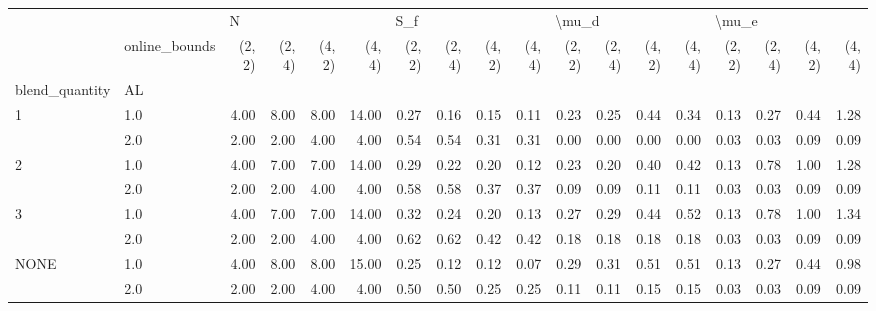 \begin{tabular}{llrrrrrrrrrrrrrrrr}
\toprule
     & {} & \multicolumn{4}{l}{N} & \multicolumn{4}{l}{S\_f} & \multicolumn{4}{l}{\textbackslash mu\_d} & \multicolumn{4}{l}{\textbackslash mu\_e} \\
     & online\_bounds & (2, 2) & (2, 4) & (4, 2) & (4, 4) & (2, 2) & (2, 4) & (4, 2) & (4, 4) & (2, 2) & (2, 4) & (4, 2) & (4, 4) & (2, 2) & (2, 4) & (4, 2) & (4, 4) \\
blend\_quantity & AL &        &        &        &        &        &        &        &        &        &        &        &        &        &        &        &        \\
\midrule
1 & 1.0 &   4.00 &   8.00 &   8.00 &  14.00 &   0.27 &   0.16 &   0.15 &   0.11 &   0.23 &   0.25 &   0.44 &   0.34 &   0.13 &   0.27 &   0.44 &   1.28 \\
     & 2.0 &   2.00 &   2.00 &   4.00 &   4.00 &   0.54 &   0.54 &   0.31 &   0.31 &   0.00 &   0.00 &   0.00 &   0.00 &   0.03 &   0.03 &   0.09 &   0.09 \\
2 & 1.0 &   4.00 &   7.00 &   7.00 &  14.00 &   0.29 &   0.22 &   0.20 &   0.12 &   0.23 &   0.20 &   0.40 &   0.42 &   0.13 &   0.78 &   1.00 &   1.28 \\
     & 2.0 &   2.00 &   2.00 &   4.00 &   4.00 &   0.58 &   0.58 &   0.37 &   0.37 &   0.09 &   0.09 &   0.11 &   0.11 &   0.03 &   0.03 &   0.09 &   0.09 \\
3 & 1.0 &   4.00 &   7.00 &   7.00 &  14.00 &   0.32 &   0.24 &   0.20 &   0.13 &   0.27 &   0.29 &   0.44 &   0.52 &   0.13 &   0.78 &   1.00 &   1.34 \\
     & 2.0 &   2.00 &   2.00 &   4.00 &   4.00 &   0.62 &   0.62 &   0.42 &   0.42 &   0.18 &   0.18 &   0.18 &   0.18 &   0.03 &   0.03 &   0.09 &   0.09 \\
NONE & 1.0 &   4.00 &   8.00 &   8.00 &  15.00 &   0.25 &   0.12 &   0.12 &   0.07 &   0.29 &   0.31 &   0.51 &   0.51 &   0.13 &   0.27 &   0.44 &   0.98 \\
     & 2.0 &   2.00 &   2.00 &   4.00 &   4.00 &   0.50 &   0.50 &   0.25 &   0.25 &   0.11 &   0.11 &   0.15 &   0.15 &   0.03 &   0.03 &   0.09 &   0.09 \\
\bottomrule
\end{tabular}
